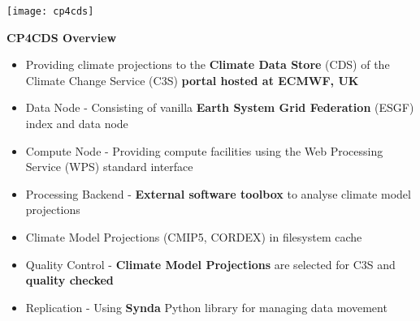 \documentclass[portrait,a0paper,fontscale=0.4]{baposter} %
\newcommand{\compresslist}{%
\setlength{\itemsep}{1pt}%
\setlength{\parskip}{0pt}%
\setlength{\parsep}{0pt}%
}
\begin{document}
\begin{poster}
{   %


   \begin{minipage}{0.4\textwidth}
     \texttt{[image: cp4cds]}
   \end{minipage}
   \begin{minipage}{0.6\textwidth}
     {\bf CP4CDS Overview}
     \begin{itemize}\compresslist
       \item Providing climate projections to the {\bf Climate Data Store} (CDS) of the
        Climate Change Service (C3S) {\bf portal hosted at ECMWF, UK}
       \item Data Node - Consisting of vanilla {\bf Earth System Grid Federation} (ESGF) index and data node
       \item Compute Node - Providing compute facilities using the Web Processing Service (WPS) standard interface
       \item Processing Backend - {\bf External software toolbox} to analyse climate model projections
       \item Climate Model Projections (CMIP5, CORDEX) in filesystem cache
       \item Quality Control - {\bf Climate Model Projections} are selected for C3S and {\bf quality checked}
       \item Replication - Using {\bf Synda} Python library for managing data movement
     \end{itemize}
  \end{minipage}
  \vspace{1em}

}
\end{poster}
\end{document}
